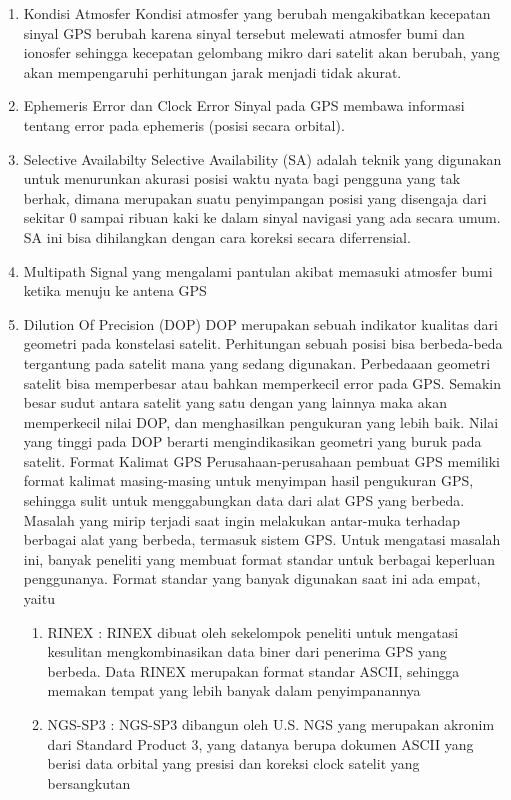 \begin{enumerate}
	\item Kondisi Atmosfer Kondisi atmosfer yang berubah mengakibatkan kecepatan sinyal GPS berubah karena sinyal tersebut melewati atmosfer bumi dan ionosfer sehingga kecepatan gelombang mikro dari satelit akan berubah, yang akan mempengaruhi perhitungan jarak menjadi tidak akurat.
	\item Ephemeris Error dan Clock Error Sinyal pada GPS membawa informasi tentang error pada ephemeris (posisi secara orbital).
	\item Selective Availabilty Selective Availability (SA) adalah teknik yang digunakan untuk menurunkan akurasi posisi waktu nyata bagi pengguna yang tak berhak, dimana merupakan suatu penyimpangan posisi yang disengaja dari sekitar 0 sampai ribuan kaki ke dalam sinyal navigasi yang ada secara umum. SA ini bisa dihilangkan dengan cara koreksi secara diferrensial.
	\item Multipath Signal yang mengalami pantulan akibat memasuki atmosfer bumi ketika menuju ke antena GPS
	\item Dilution Of Precision (DOP) DOP merupakan sebuah indikator kualitas dari geometri pada konstelasi satelit. Perhitungan sebuah posisi bisa berbeda-beda tergantung pada satelit mana yang sedang digunakan. Perbedaaan geometri satelit bisa memperbesar atau bahkan memperkecil error pada GPS. Semakin besar sudut antara satelit yang satu dengan yang lainnya maka akan memperkecil nilai DOP, dan menghasilkan pengukuran yang lebih baik. Nilai yang tinggi pada DOP berarti mengindikasikan geometri yang buruk pada satelit.
Format Kalimat GPS Perusahaan-perusahaan pembuat GPS memiliki format kalimat masing-masing untuk menyimpan hasil pengukuran GPS, sehingga sulit untuk menggabungkan data dari alat GPS yang berbeda. Masalah yang mirip terjadi saat ingin melakukan antar-muka terhadap berbagai alat yang berbeda, termasuk sistem GPS. Untuk mengatasi masalah ini, banyak peneliti yang membuat format standar untuk berbagai keperluan penggunanya. Format standar yang banyak digunakan saat ini ada empat, yaitu
	\begin{enumerate}
		\item RINEX : RINEX dibuat oleh sekelompok peneliti untuk mengatasi kesulitan mengkombinasikan data biner dari penerima GPS yang berbeda. Data RINEX merupakan format standar ASCII, sehingga memakan tempat yang lebih banyak dalam penyimpanannya
		\item NGS-SP3 : NGS-SP3 dibangun oleh U.S. NGS yang merupakan akronim dari Standard Product 3, yang datanya berupa dokumen ASCII yang berisi data orbital yang presisi dan koreksi clock satelit yang bersangkutan

\end{enumerate}
\end{enumerate}
